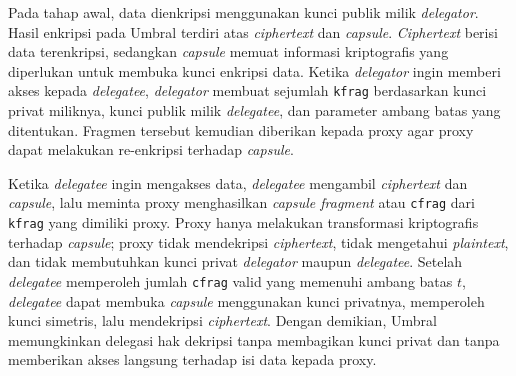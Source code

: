 Pada tahap awal, data dienkripsi menggunakan kunci publik milik \textit{delegator}. Hasil enkripsi pada Umbral terdiri atas \textit{ciphertext} dan \textit{capsule}. \textit{Ciphertext} berisi data terenkripsi, sedangkan \textit{capsule} memuat informasi kriptografis yang diperlukan untuk membuka kunci enkripsi data. Ketika \textit{delegator} ingin memberi akses kepada \textit{delegatee}, \textit{delegator} membuat sejumlah \texttt{kfrag} berdasarkan kunci privat miliknya, kunci publik milik \textit{delegatee}, dan parameter ambang batas yang ditentukan. Fragmen tersebut kemudian diberikan kepada proxy agar proxy dapat melakukan re-enkripsi terhadap \textit{capsule}.

Ketika \textit{delegatee} ingin mengakses data, \textit{delegatee} mengambil \textit{ciphertext} dan \textit{capsule}, lalu meminta proxy menghasilkan \textit{capsule fragment} atau \texttt{cfrag} dari \texttt{kfrag} yang dimiliki proxy. Proxy hanya melakukan transformasi kriptografis terhadap \textit{capsule}; proxy tidak mendekripsi \textit{ciphertext}, tidak mengetahui \textit{plaintext}, dan tidak membutuhkan kunci privat \textit{delegator} maupun \textit{delegatee}. Setelah \textit{delegatee} memperoleh jumlah \texttt{cfrag} valid yang memenuhi ambang batas $t$, \textit{delegatee} dapat membuka \textit{capsule} menggunakan kunci privatnya, memperoleh kunci simetris, lalu mendekripsi \textit{ciphertext}. Dengan demikian, Umbral memungkinkan delegasi hak dekripsi tanpa membagikan kunci privat dan tanpa memberikan akses langsung terhadap isi data kepada proxy.
